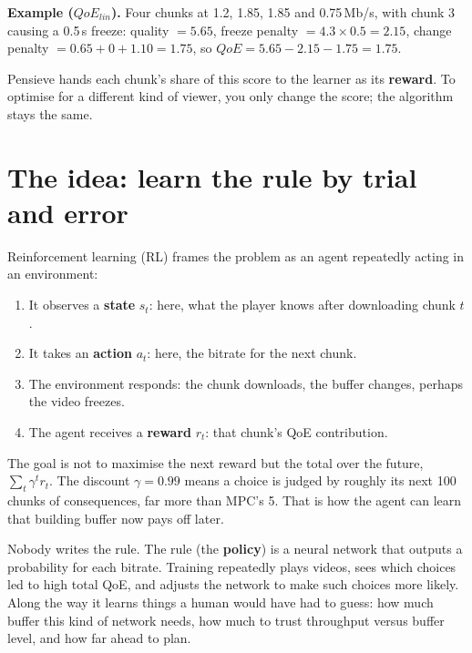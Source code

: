 \textbf{Example ($QoE_{lin}$).} Four chunks at 1.2, 1.85, 1.85 and 0.75\,Mb/s, with chunk 3 causing a 0.5\,s freeze:
quality $= 5.65$, freeze penalty $= 4.3 \times 0.5 = 2.15$, change penalty $= 0.65 + 0 + 1.10 = 1.75$, so $QoE = 5.65 - 2.15 - 1.75 = 1.75$.

Pensieve hands each chunk's share of this score to the learner as its \textbf{reward}. To optimise for a different kind of viewer, you only change the
score; the algorithm stays the same.

\section{The idea: learn the rule by trial and error}


Reinforcement learning (RL) frames the problem as an agent repeatedly acting in an environment:
\begin{enumerate}
  \item It observes a \textbf{state} $s_t$: here, what the player knows after downloading chunk $t$.
  \item It takes an \textbf{action} $a_t$: here, the bitrate for the next chunk.
  \item The environment responds: the chunk downloads, the buffer changes, perhaps the video freezes.
  \item The agent receives a \textbf{reward} $r_t$: that chunk's QoE contribution.
\end{enumerate}
The goal is not to maximise the next reward but the total over the future, $\sum_t \gamma^t r_t$. The discount $\gamma = 0.99$ means a choice is
judged by roughly its next 100 chunks of consequences, far more than MPC's 5. That is how the agent can learn that building buffer now pays off later.

Nobody writes the rule. The rule (the \textbf{policy}) is a neural network that outputs a probability for each bitrate. Training repeatedly plays
videos, sees which choices led to high total QoE, and adjusts the network to make such choices more likely. Along the way it learns things a human
would have had to guess: how much buffer this kind of network needs, how much to trust throughput versus buffer level, and how far ahead to plan.

